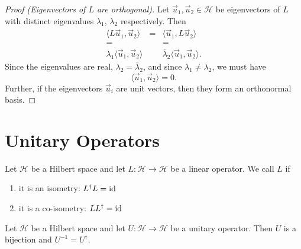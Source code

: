 \begin{proof}[Proof (Eigenvectors of $L$ are orthogonal)]
Let $\vec{u}_{1}, \vec{u}_{2}\in\mathcal{H}$ be eigenvectors of $L$ with
distinct eigenvalues $\lambda_{1}$, $\lambda_{2}$ respectively.
Then
\begin{equation}
  \begin{array}{ccc}
    \langle L\vec{u}_{1},\vec{u}_{2}\rangle & = & \langle \vec{u}_{1},L\vec{u}_{2}\rangle\\
= &  & =\\
\lambda_{1}\langle\vec{u}_{1},\vec{u}_{2}\rangle & & \overline{\lambda}_{2}\langle\vec{u}_{1},\vec{u}_{2}\rangle.
  \end{array}
\end{equation}
Since the eigenvalues are real, $\lambda_{2}=\overline{\lambda}_{2}$,
and since $\lambda_{1}\neq\lambda_{2}$, we must have
\begin{equation}
\langle\vec{u}_{1},\vec{u}_{2}\rangle=0.
\end{equation}
Further, if the eigenvectors $\vec{u}_{i}$ are unit vectors, then they
form an orthonormal basis.
\end{proof}

\section{Unitary Operators}

\begin{definition}
Let $\mathcal{H}$ be a Hilbert space and
let $L\colon\mathcal{H}\to\mathcal{H}$ be a linear operator.
We call $L$  if
\begin{enumerate}
\item it is an isometry: $L^{\dagger}L=\operatorname{id}$
\item it is a co-isometry: $LL^{\dagger}=\operatorname{id}$
\end{enumerate}
\end{definition}

\begin{theorem}
Let $\mathcal{H}$ be a Hilbert space and
let $U\colon\mathcal{H}\to\mathcal{H}$ be a unitary operator.
Then $U$ is a bijection and $U^{-1}=U^{\dagger}$.
\end{theorem}